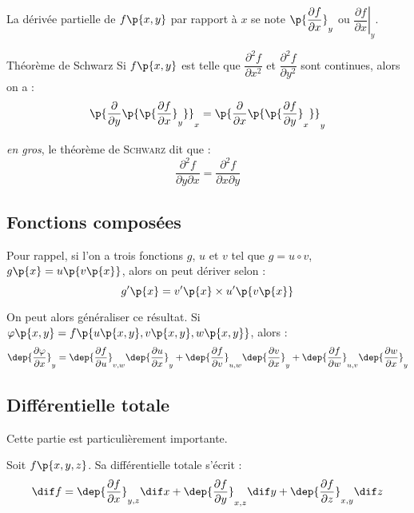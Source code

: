     \begin{notation}
        La dérivée partielle de $f\p{x, y}$ par rapport à $x$ se note $\p{\dfrac{\partial f}{\partial x}}_y$ ou $\left.\dfrac{\partial f}{\partial x}\right\vert_y$.
    \end{notation}
    
    \begin{theorem}{Théorème de Schwarz}{}
        Si $f\p{x, y}$ est telle que $\dfrac{\partial^2 f}{\partial x^2}$ et $\dfrac{\partial^2 f}{\partial y^2}$ sont continues, alors on a :
        \[ \p{\dfrac{\partial}{\partial y}\p{\p{\dfrac{\partial f}{\partial x}}_y}}_x = \p{\dfrac{\partial}{\partial x}\p{\p{\dfrac{\partial f}{\partial y}}_x}}_y \]
    \end{theorem}
    
    \textit{en gros}, le théorème de \textsc{Schwarz} dit que :
    \[ \dfrac{\partial^2 f}{\partial y \partial x} = \dfrac{\partial^2 f}{\partial x \partial y}\]
    
    \subsection{Fonctions composées}
    
    Pour rappel, si l'on a trois fonctions $g$, $u$ et $v$ tel que $g = u \circ v$, \ie $g\p{x} = u\p{v\p{x}}$, alors on peut dériver selon :
    \[ g'\p{x} = v'\p{x} \times u'\p{v\p{x}}\]
    
    On peut alors généraliser ce résultat. Si $\varphi\p{x, y} = f\p{u\p{x, y}, v\p{x, y}, w\p{x, y}}$, alors :
    \[ \dep{\dfrac{\partial \varphi}{\partial x}}_y = \dep{\dfrac{\partial f}{\partial u}}_{v, w}\dep{\dfrac{\partial u}{\partial x}}_y + \dep{\dfrac{\partial f}{\partial v}}_{u, w}\dep{\dfrac{\partial v}{\partial x}}_y + \dep{\dfrac{\partial f}{\partial w}}_{u, v}\dep{\dfrac{\partial w}{\partial x}}_y\]
    
    \subsection{Différentielle totale}
    
    Cette partie est particulièrement importante.
    
    \begin{definition}{}{}
        Soit $f\p{x, y, z}$. Sa différentielle totale s'écrit :
        \[ \dif f = \dep{\dfrac{\partial f}{\partial x}}_{y, z} \dif x + \dep{\dfrac{\partial f}{\partial y}}_{x, z} \dif y + \dep{\dfrac{\partial f}{\partial z}}_{x, y} \dif z \]
    \end{definition}
    
